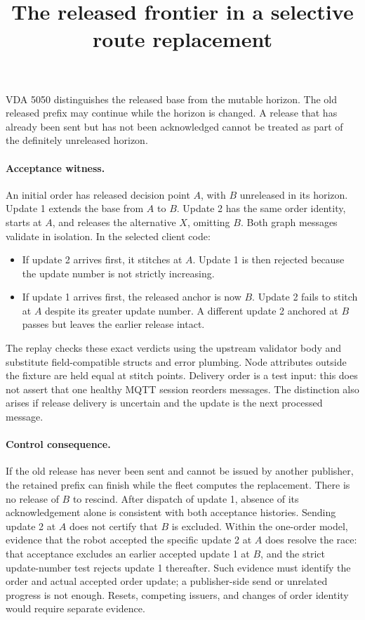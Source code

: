 \documentclass[11pt]{article}
\title{The released frontier in a selective route replacement}
\begin{document}
\maketitle

VDA 5050 distinguishes the released base from the mutable horizon.
The old released prefix may continue while the horizon is changed.
A release that has already been sent but has not been acknowledged
cannot be treated as part of the definitely unreleased horizon.

\paragraph{Acceptance witness.}
An initial order has released decision point \(A\), with \(B\)
unreleased in its horizon. Update 1 extends the base from \(A\) to
\(B\). Update 2 has the same order identity, starts at \(A\), and
releases the alternative \(X\), omitting \(B\). Both graph messages
validate in isolation. In the selected client code:
\begin{itemize}
\item If update 2 arrives first, it stitches at \(A\). Update 1 is
then rejected because the update number is not strictly increasing.
\item If update 1 arrives first, the released anchor is now \(B\).
Update 2 fails to stitch at \(A\) despite its greater update number.
A different update 2 anchored at \(B\) passes but leaves the earlier
release intact.
\end{itemize}
The replay checks these exact verdicts using the upstream validator
body and substitute field-compatible structs and error plumbing.
Node attributes outside the fixture are held equal at stitch points.
Delivery order is a test input: this does not assert that one healthy
MQTT session reorders messages. The distinction also arises if release
delivery is uncertain and the update is the next processed message.

\paragraph{Control consequence.}
If the old release has never been sent and cannot be issued by another
publisher, the retained prefix can finish while the fleet computes
the replacement. There is no release of \(B\) to rescind. After
dispatch of update 1, absence of its acknowledgement alone is
consistent with both acceptance histories. Sending update 2 at \(A\)
does not certify that \(B\) is excluded. Within the one-order model,
evidence that the robot accepted the specific update 2 at \(A\)
does resolve the race: that acceptance excludes an earlier accepted
update 1 at \(B\), and the strict update-number test rejects update 1
thereafter. Such evidence must identify the order and actual accepted
order update; a publisher-side send or unrelated progress is not
enough. Resets, competing issuers, and changes of order identity
would require separate evidence.
\end{document}
